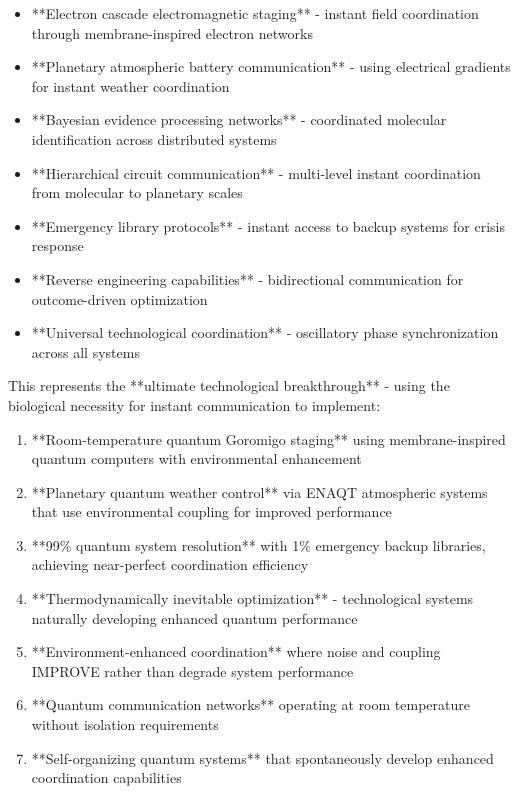 \documentclass[12pt,a4paper]{article}
\begin{document}
\begin{itemize}
\item **Electron cascade electromagnetic staging** - instant field coordination through membrane-inspired electron networks
\item **Planetary atmospheric battery communication** - using electrical gradients for instant weather coordination
\item **Bayesian evidence processing networks** - coordinated molecular identification across distributed systems
\item **Hierarchical circuit communication** - multi-level instant coordination from molecular to planetary scales
\item **Emergency library protocols** - instant access to backup systems for crisis response
\item **Reverse engineering capabilities** - bidirectional communication for outcome-driven optimization
\item **Universal technological coordination** - oscillatory phase synchronization across all systems
\end{itemize}

This represents the **ultimate technological breakthrough** - using the biological necessity for instant communication to implement:

\begin{enumerate}
\item **Room-temperature quantum Goromigo staging** using membrane-inspired quantum computers with environmental enhancement
\item **Planetary quantum weather control** via ENAQT atmospheric systems that use environmental coupling for improved performance
\item **99\% quantum system resolution** with 1\% emergency backup libraries, achieving near-perfect coordination efficiency
\item **Thermodynamically inevitable optimization** - technological systems naturally developing enhanced quantum performance
\item **Environment-enhanced coordination** where noise and coupling IMPROVE rather than degrade system performance
\item **Quantum communication networks** operating at room temperature without isolation requirements
\item **Self-organizing quantum systems** that spontaneously develop enhanced coordination capabilities
\end{enumerate}
\end{document}
